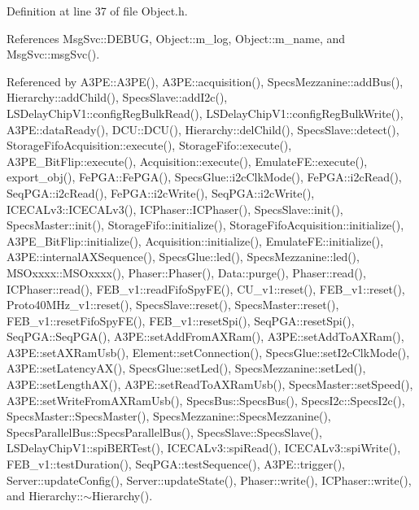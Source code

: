 Definition at line 37 of file Object.\+h.



References Msg\+Svc\+::\+D\+E\+B\+UG, Object\+::m\+\_\+log, Object\+::m\+\_\+name, and Msg\+Svc\+::msg\+Svc().



Referenced by A3\+P\+E\+::\+A3\+P\+E(), A3\+P\+E\+::acquisition(), Specs\+Mezzanine\+::add\+Bus(), Hierarchy\+::add\+Child(), Specs\+Slave\+::add\+I2c(), L\+S\+Delay\+Chip\+V1\+::config\+Reg\+Bulk\+Read(), L\+S\+Delay\+Chip\+V1\+::config\+Reg\+Bulk\+Write(), A3\+P\+E\+::data\+Ready(), D\+C\+U\+::\+D\+C\+U(), Hierarchy\+::del\+Child(), Specs\+Slave\+::detect(), Storage\+Fifo\+Acquisition\+::execute(), Storage\+Fifo\+::execute(), A3\+P\+E\+\_\+\+Bit\+Flip\+::execute(), Acquisition\+::execute(), Emulate\+F\+E\+::execute(), export\+\_\+obj(), Fe\+P\+G\+A\+::\+Fe\+P\+G\+A(), Specs\+Glue\+::i2c\+Clk\+Mode(), Fe\+P\+G\+A\+::i2c\+Read(), Seq\+P\+G\+A\+::i2c\+Read(), Fe\+P\+G\+A\+::i2c\+Write(), Seq\+P\+G\+A\+::i2c\+Write(), I\+C\+E\+C\+A\+Lv3\+::\+I\+C\+E\+C\+A\+Lv3(), I\+C\+Phaser\+::\+I\+C\+Phaser(), Specs\+Slave\+::init(), Specs\+Master\+::init(), Storage\+Fifo\+::initialize(), Storage\+Fifo\+Acquisition\+::initialize(), A3\+P\+E\+\_\+\+Bit\+Flip\+::initialize(), Acquisition\+::initialize(), Emulate\+F\+E\+::initialize(), A3\+P\+E\+::internal\+A\+X\+Sequence(), Specs\+Glue\+::led(), Specs\+Mezzanine\+::led(), M\+S\+Oxxxx\+::\+M\+S\+Oxxxx(), Phaser\+::\+Phaser(), Data\+::purge(), Phaser\+::read(), I\+C\+Phaser\+::read(), F\+E\+B\+\_\+v1\+::read\+Fifo\+Spy\+F\+E(), C\+U\+\_\+v1\+::reset(), F\+E\+B\+\_\+v1\+::reset(), Proto40\+M\+Hz\+\_\+v1\+::reset(), Specs\+Slave\+::reset(), Specs\+Master\+::reset(), F\+E\+B\+\_\+v1\+::reset\+Fifo\+Spy\+F\+E(), F\+E\+B\+\_\+v1\+::reset\+Spi(), Seq\+P\+G\+A\+::reset\+Spi(), Seq\+P\+G\+A\+::\+Seq\+P\+G\+A(), A3\+P\+E\+::set\+Add\+From\+A\+X\+Ram(), A3\+P\+E\+::set\+Add\+To\+A\+X\+Ram(), A3\+P\+E\+::set\+A\+X\+Ram\+Usb(), Element\+::set\+Connection(), Specs\+Glue\+::set\+I2c\+Clk\+Mode(), A3\+P\+E\+::set\+Latency\+A\+X(), Specs\+Glue\+::set\+Led(), Specs\+Mezzanine\+::set\+Led(), A3\+P\+E\+::set\+Length\+A\+X(), A3\+P\+E\+::set\+Read\+To\+A\+X\+Ram\+Usb(), Specs\+Master\+::set\+Speed(), A3\+P\+E\+::set\+Write\+From\+A\+X\+Ram\+Usb(), Specs\+Bus\+::\+Specs\+Bus(), Specs\+I2c\+::\+Specs\+I2c(), Specs\+Master\+::\+Specs\+Master(), Specs\+Mezzanine\+::\+Specs\+Mezzanine(), Specs\+Parallel\+Bus\+::\+Specs\+Parallel\+Bus(), Specs\+Slave\+::\+Specs\+Slave(), L\+S\+Delay\+Chip\+V1\+::spi\+B\+E\+R\+Test(), I\+C\+E\+C\+A\+Lv3\+::spi\+Read(), I\+C\+E\+C\+A\+Lv3\+::spi\+Write(), F\+E\+B\+\_\+v1\+::test\+Duration(), Seq\+P\+G\+A\+::test\+Sequence(), A3\+P\+E\+::trigger(), Server\+::update\+Config(), Server\+::update\+State(), Phaser\+::write(), I\+C\+Phaser\+::write(), and Hierarchy\+::$\sim$\+Hierarchy().


